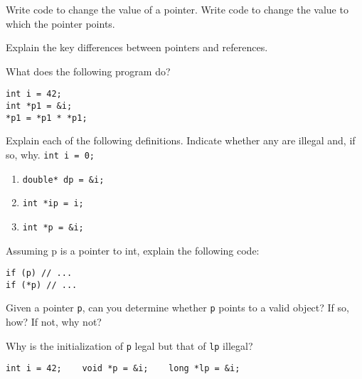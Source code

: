 %
%
\begin{question}
Write code to change the value of a pointer. Write code to
change the value to which the pointer points.
\end{question}

\begin{question}
Explain the key differences between pointers and references.
\end{question}

\begin{question}
What does the following program do?
\begin{lstlisting}
int i = 42;
int *p1 = &i;
*p1 = *p1 * *p1;
\end{lstlisting}
\end{question}

\begin{question}
Explain each of the following definitions. Indicate whether
any are illegal and, if so, why.
\verb|int i = 0;|
\begin{enumerate}[label=(\alph*)]
^^I\item \verb|double* dp = &i;|
^^I\item \verb|int *ip = i;|
^^I\item \verb|int *p = &i;|
\end{enumerate}
\end{question}

\begin{question}
Assuming p is a pointer to int, explain the following code:
\begin{lstlisting}
if (p) // ...
if (*p) // ...
\end{lstlisting}
\end{question}

\begin{question}
Given a pointer \verb|p|, can you determine whether \verb|p| points to a
valid object? If so, how? If not, why not?
\end{question}

\begin{question}
Why is the initialization of \verb|p| legal but that of \verb|lp| illegal?
\begin{lstlisting}
int i = 42;    void *p = &i;    long *lp = &i;
\end{lstlisting}
\end{question}
